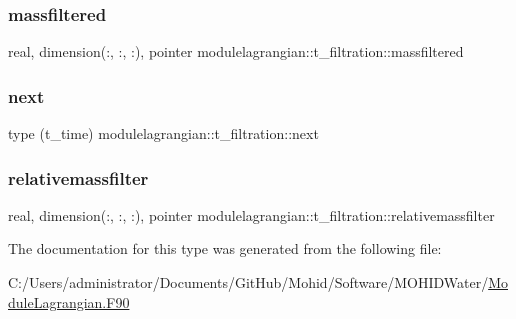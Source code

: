 \subsubsection{\texorpdfstring{massfiltered}{massfiltered}}
{\footnotesize\ttfamily real, dimension(\+:, \+:, \+:), pointer modulelagrangian\+::t\+\_\+filtration\+::massfiltered\hspace{0.3cm}{\ttfamily [private]}}

\mbox{\label{structmodulelagrangian_1_1t__filtration_ae30c10db08fa89805e61444f8dd13215}} 
\subsubsection{\texorpdfstring{next}{next}}
{\footnotesize\ttfamily type (t\+\_\+time) modulelagrangian\+::t\+\_\+filtration\+::next\hspace{0.3cm}{\ttfamily [private]}}

\mbox{\label{structmodulelagrangian_1_1t__filtration_af69b142f063ee712858bf255cb310905}} 
\subsubsection{\texorpdfstring{relativemassfilter}{relativemassfilter}}
{\footnotesize\ttfamily real, dimension(\+:, \+:, \+:), pointer modulelagrangian\+::t\+\_\+filtration\+::relativemassfilter\hspace{0.3cm}{\ttfamily [private]}}



The documentation for this type was generated from the following file\+:\begin{DoxyCompactItemize}
\item 
C\+:/\+Users/administrator/\+Documents/\+Git\+Hub/\+Mohid/\+Software/\+M\+O\+H\+I\+D\+Water/\mbox{\hyperlink{_module_lagrangian_8_f90}{Module\+Lagrangian.\+F90}}\end{DoxyCompactItemize}
